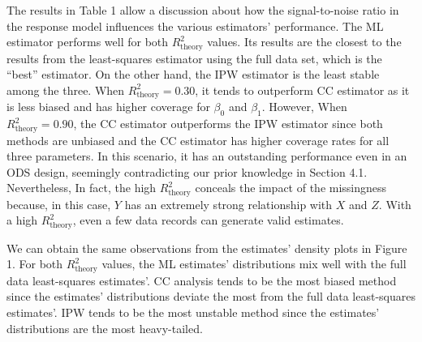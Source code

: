 \documentclass[
  12pt,
]{article}
\begin{document}
The results in Table 1 allow a discussion about how the signal-to-noise
ratio in the response model influences the various estimators'
performance. The ML estimator performs well for both
\(R_{\mathrm{theory}}^2\) values. Its results are the closest to the
results from the least-squares estimator using the full data set, which
is the ``best'' estimator. On the other hand, the IPW estimator is the
least stable among the three. When \(R_{\mathrm{theory}}^2 = 0.30\), it
tends to outperform CC estimator as it is less biased and has higher
coverage for \(\beta_0\) and \(\beta_1\). However, When
\(R_{\mathrm{theory}}^2 = 0.90\), the CC estimator outperforms the IPW
estimator since both methods are unbiased and the CC estimator has
higher coverage rates for all three parameters. In this scenario, it has
an outstanding performance even in an ODS design, seemingly
contradicting our prior knowledge in Section 4.1. Nevertheless, In fact,
the high \(R_{\mathrm{theory}}^2\) conceals the impact of the
missingness because, in this case, \(Y\) has an extremely strong
relationship with \(X\) and \(Z\). With a high
\(R_{\mathrm{theory}}^2\), even a few data records can generate valid
estimates.

We can obtain the same observations from the estimates' density plots in
Figure 1. For both \(R_{\mathrm{theory}}^2\) values, the ML estimates'
distributions mix well with the full data least-squares estimates'. CC
analysis tends to be the most biased method since the estimates'
distributions deviate the most from the full data least-squares
estimates'. IPW tends to be the most unstable method since the
estimates' distributions are the most heavy-tailed.
\end{document}

